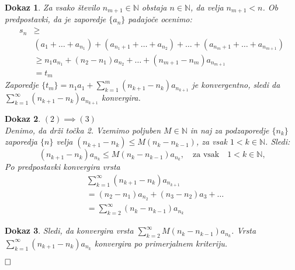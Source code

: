 \documentclass{beamer}
\def\qed{$\hfill\Box$}   %
\newtheorem{dokaz}{Dokaz}
\def\N{\mathbb{N}} %
\begin{document}
\begin{frame}
    \begin{dokaz}
        Za vsako število $n_{m + 1} \in \N$ obstaja $n \in \N$, da velja $n_{m + 1} < n$.
        \pause
        Ob predpostavki, da je zaporedje $\{a_n\}$ padajoče ocenimo:
        \[
            \begin{split}
                s_n & \geq \\
                & (a_1 + \ldots + a_{n_1}) + (a_{n_{1} + 1} + \ldots + a_{n_2}) + \ldots + (a_{n_{m} + 1} + \ldots + a_{n_{m+1}})\\
                & \geq n_1a_{n_1} + (n_2 - n_1)a_{n_2} + \ldots + (n_{m + 1} - n_{m})a_{n_{m+ 1}}\\
                & = t_m
            \end{split}
        \]
        \pause
        Zaporedje $\{t_m\}  = n_1a_1 + \sum_{k = 1}^{m}{(n_{k+1} - n_k)a_{n_{k + 1}}}$ je konvergentno, sledi
        da $\sum_{k = 1}^{\infty}{(n_{k+1} - n_k)a_{n_{k + 1}}}$ konvergira.
    \end{dokaz}
\end{frame}
\begin{frame}
    \begin{dokaz}
        $(2) \implies (3)$\\
        Denimo, da drži točka 2.
        Vzemimo poljuben $M \in \N$ in naj za podzaporedje $\{n_k\}$ zaporedja $\{n\}$ velja
        $ (n_{k+1} - n_k) \leq M(n_k - n_{k - 1})$, za vsak $ 1 < k \in \N$.
        \pause
        Sledi:
        \[
            (n_{k+1} - n_k)a_{n_k} \leq M(n_k - n_{k - 1})a_{n_k}, \quad \text{za vsak} \quad  1 < k \in \N \text{,}
        \]
        \pause
        Po predpostavki konvergira vrsta
        \[
            \begin{split}
            & \sum_{k = 1}^{\infty}{(n_{k+1} - n_k)a_{n_{k + 1}}}\\
            & = (n_2 -n_1)a_{n_2} + (n_3 - n_2)a_3 + \ldots \\
            & = \sum_{k = 2}^{\infty}{(n_k - n_{k - 1})a_{n_k}}
            \end{split}
        \]
    \end{dokaz}
\end{frame}
\begin{frame}
    \begin{dokaz}
        Sledi, da konvergira vrsta $\sum_{k = 2}^{\infty}{M(n_k - n_{k - 1})a_{n_k}}$.
        \pause
        Vrsta $\sum_{k = 1}^{\infty}{(n_{k+1} - n_k)a_{n_{k}}}$ konvergira po primerjalnem kriteriju.

        \qed
    \end{dokaz}
\end{frame}
\end{document}

